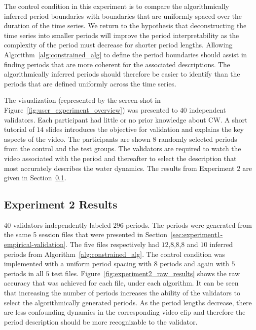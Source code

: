 The control condition in this experiment is to compare the algorithmically inferred period boundaries with boundaries that are uniformly spaced over the duration of the time series. We return to the hypothesis that deconstructing the time series into smaller periods will improve the period interpretability as the complexity of the period must decrease for shorter period lengths. Allowing Algorithm~\ref{alg:constrained_alg} to define the period boundaries should assist in finding periods that are more coherent for the associated descriptions. The algorithmically inferred periods should therefore be easier to identify than the periods that are defined uniformly across the time series.

The visualization (represented by the screen-shot in Figure~\ref{fig:user_experiment_overview}) was presented to $40$ independent validators. Each participant had little or no prior knowledge about CW. A short tutorial of $14$ slides introduces the objective for validation and explains the key aspects of the video. The participants are shown $8$ randomly selected periods from the control and the test groups. The validators are required to watch the video associated with the period and thereafter to select the description that most accurately describes the water dynamics. The results from Experiment 2 are given in Section~\ref{sec:experiment2-empirical-validation-results}.

\subsection{Experiment 2 Results}\label{sec:experiment2-empirical-validation-results}

$40$ validators independently labeled $296$ periods. The periods were generated from the same 5 session files that were presented in Section~\ref{sec:experiment1-empirical-validation}. The five files respectively had $12$,$8$,$8$,$8$ and $10$ inferred periods from Algorithm~\ref{alg:constrained_alg}. The control condition was implemented with a uniform period spacing with $8$ periods and again with $5$ periods in all $5$ test files. Figure~\ref{fig:experiment2_raw_results} shows the raw accuracy that was achieved for each file, under each algorithm. It can be seen that increasing the number of periods increases the ability of the validators to select the algorithmically generated periods. As the period lengths decrease, there are less confounding dynamics in the corresponding video clip and therefore the period description should be more recognizable to the validator.

